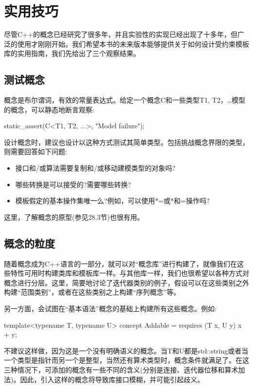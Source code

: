 \section{实用技巧}

尽管C++的概念已经研究了很多年，并且实验性的实现已经出现了十多年，但广泛的使用才刚刚开始。我们希望本书的未来版本能够提供关于如何设计受约束模板库的实用指南，我们先给出了三个观察结果。

\subsection{测试概念}

概念是布尔谓词，有效的常量表达式。给定一个概念C和一些类型T1, T2，…模型的概念，可以静态地断言观察:

\begin{cpp}
static_assert(C<T1, T2, ...>, "Model failure");
\end{cpp}

设计概念时，建议也设计以这种方式测试其简单类型。包括挑战概念界限的类型，则需要回答如下问题:

\begin{itemize}
\item 
接口和/或算法需要复制和/或移动建模类型的对象吗?

\item 
哪些转换是可以接受的?需要哪些转换?

\item 
模板假定的基本操作集唯一么?例如，可以使用*=或*和=操作吗?
\end{itemize}

这里，了解概念的原型(参见28.3节)也很有用。

\subsection{概念的粒度}

随着概念成为C++语言的一部分，就可以对“概念库”进行构建了，就像我们在这些特性可用时构建类库和模板库一样。与其他库一样，我们也很希望以各种方式对概念进行分层。这里，简要地讨论了迭代器类别的例子，假设可以在这些类别之外构建“范围类别”，或者在这些类别之上构建“序列概念”等。

另一方面，会试图在“基本语法”概念的基础上构建所有这些概念。例如:

\begin{cpp}
template<typename T, typename U>
concept Addable =
requires (T x, U y) {
	x + y;
}
\end{cpp}

不建议这样做，因为这是一个没有明确语义的概念。当T和U都是std::string或者当一个类型是指针而另一个是整型，当然还有算术类型时，概念条件就满足了。在这三种情况下，可添加的概念有一些不同的含义(分别是连接、迭代器位移和算术加法)。因此，引入这样的概念将导致库接口模糊，并可能引起歧义。

